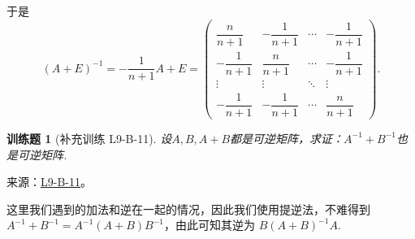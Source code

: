 \documentclass[UTF8,12pt,a4paper,fontset=fandol]{ctexart}
\newtheorem{exercise}{训练题}[section]
\begin{document}
\begin{solve}
\begin{enumerate}
                    于是
                    \[
                        (A+E)^{-1} = -\frac{1}{n+1} A + E = \begin{pmatrix}
                            \dfrac{n}{n+1}  & -\dfrac{1}{n+1} & \cdots & -\dfrac{1}{n+1} \\[2em]
                            -\dfrac{1}{n+1} & \dfrac{n}{n+1}  & \cdots & -\dfrac{1}{n+1} \\[2em]
                            \vdots          & \vdots          & \ddots & \vdots          \\[2em]
                            -\dfrac{1}{n+1} & -\dfrac{1}{n+1} & \cdots & \dfrac{n}{n+1}
                        \end{pmatrix}.
                    \]
            \end{enumerate}
\end{solve}

\begin{exercise}[补充训练 L9-B-11]\label{prob:L9-B-11}
设$A,B,A+B$都是可逆矩阵，求证：$A^{-1}+B^{-1}$也是可逆矩阵.
\end{exercise}
\noindent 来源：\href{https://github.com/yhwu-is/Linear-Algebra-Left-Undone/blob/new/%E8%AE%B2%E4%B9%89/%E4%B8%93%E9%A2%98/9%20%E7%9F%A9%E9%98%B5%E8%BF%90%E7%AE%97%E8%BF%9B%E9%98%B6.tex}{L9-B-11}。
\begin{solve}
这里我们遇到的加法和逆在一起的情况，因此我们使用提逆法，不难得到 $A^{-1}+B^{-1}=A^{-1}(A+B)B^{-1}$，由此可知其逆为 $B(A+B)^{-1}A$.
\end{solve}
\end{document}
